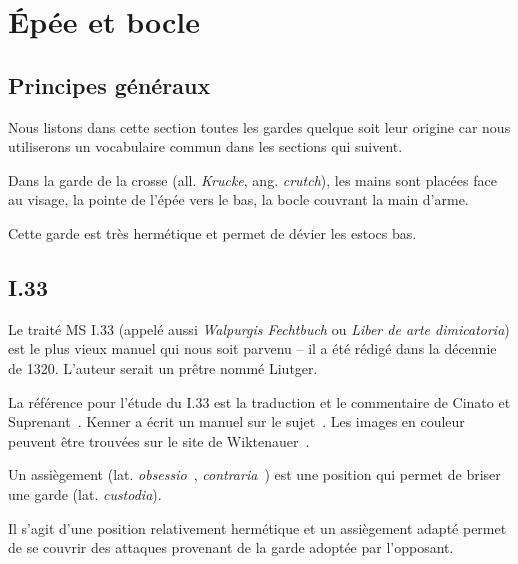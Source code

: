 \chapter{Épée et bocle}


\section{Principes généraux}


Nous listons dans cette section toutes les gardes quelque soit leur origine car nous utiliserons un vocabulaire commun dans les sections qui suivent.



\begin{garde}

Dans la garde de la crosse (all. \emph{Krucke}, ang. \emph{crutch}), les mains sont placées face au visage, la pointe de l'épée vers le bas, la bocle couvrant la main d'arme.

\end{garde}

Cette garde est très hermétique et permet de dévier les estocs bas.


\section{I.33}



Le traité MS I.33 (appelé aussi \emph{Walpurgis Fechtbuch} ou \emph{Liber de arte dimicatoria}) est le plus vieux manuel qui nous soit parvenu – il a été rédigé dans la décennie de 1320.
L'auteur serait un prêtre nommé Liutger.

La référence pour l'étude du I.33 est la traduction et le commentaire de Cinato et Suprenant~\cite{cinato:I33:2009}.
Kenner a écrit un manuel sur le sujet~\cite{kenner:I33:2014}.
Les images en couleur peuvent être trouvées sur le site de Wiktenauer~\cite{wiktenauer:I33}.



\begin{definition}[Assiègement]

Un assiègement (lat. \emph{obsessio}~\cite{cinato:I33:2009}, \emph{contraria}~\cite{kenner:I33:2014}) est une position qui permet de briser une garde (lat. \emph{custodia}).

Il s'agit d'une position relativement hermétique et un assiègement adapté permet de se couvrir des attaques provenant de la garde adoptée par l'opposant.

\end{definition}

